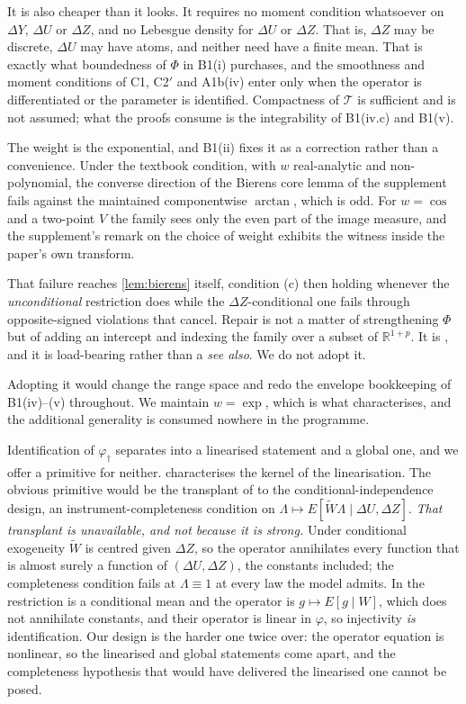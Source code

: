 \documentclass[
  12pt]{article}
\newcommand{\1}[1]{\mathds{1}\left[#1\right]}
\theoremstyle{plain}
\theoremstyle{definition}
\theoremstyle{definition}
\theoremstyle{remark}
\newcommand{\IR}{\mathbb{R}}
\newcommand{\vdagger}{\varphi_{\dagger}}
\begin{document}
It is also cheaper than it looks. It requires no moment condition
whatsoever on \(\Delta Y\), \(\Delta U\) or \(\Delta Z\), and no
Lebesgue density for \(\Delta U\) or \(\Delta Z\). That is, \(\Delta Z\)
may be discrete, \(\Delta U\) may have atoms, and neither need have a
finite mean. That is exactly what boundedness of \(\Phi\) in B1(i)
purchases, and the smoothness and moment conditions of C1, C2\('\) and
A1b(iv) enter only when the operator is differentiated or the parameter
is identified. Compactness of \(\mathcal T\) is sufficient and is not
assumed; what the proofs consume is the integrability of B1(iv.c) and
B1(v).

The weight is the exponential, and B1(ii) fixes it as a correction
rather than a convenience. Under the textbook condition, with \(w\)
real-analytic and non-polynomial, the converse direction of the Bierens
core lemma of the supplement fails against the maintained componentwise
\(\arctan\), which is odd. For \(w=\cos\) and a two-point \(V\) the
family sees only the even part of the image measure, and the
supplement's remark on the choice of weight exhibits the witness inside
the paper's own transform.

That failure reaches \cref{lem:bierens} itself, condition (c) then
holding whenever the \emph{unconditional} restriction does while the
\(\Delta Z\)-conditional one fails through opposite-signed violations
that cancel. Repair is not a matter of strengthening \(\Phi\) but of
adding an intercept and indexing the family over a subset of
\(\IR^{1+p}\). It is \citet[Thm.~3.1]{stinchcombewhite1998}, and it is
load-bearing rather than a \emph{see also}. We do not adopt it.

Adopting it would change the range space and redo the envelope
bookkeeping of B1(iv)--(v) throughout. We maintain \(w=\exp\), which is
what \citet[Thm.~1]{bierens1990} characterises, and the additional
generality is consumed nowhere in the programme.

Identification of \(\vdagger\) separates into a linearised statement and
a global one, and we offer a primitive for neither. 
characterises the kernel of the linearisation. The obvious primitive
would be the transplant of \citet[Prop.~2.2]{feve2014} to the
conditional-independence design, an instrument-completeness condition on
\(\Lambda\mapsto E[\widetilde W\Lambda\mid\Delta U,\Delta Z]\).
\emph{That transplant is unavailable, and not because it is strong.}
Under conditional exogeneity \(\widetilde W\) is centred given
\(\Delta Z\), so the operator annihilates every function that is almost
surely a function of \((\Delta U,\Delta Z)\), the constants included;
the completeness condition fails at \(\Lambda\equiv1\) at every law the
model admits. In \citet{feve2014} the restriction is a conditional mean
and the operator is \(g\mapsto E[g\mid W]\), which does not annihilate
constants, and their operator is linear in \(\varphi\), so injectivity
\emph{is} identification. Our design is the harder one twice over: the
operator equation is nonlinear, so the linearised and global statements
come apart, and the completeness hypothesis that would have delivered
the linearised one cannot be posed.
\end{document}
